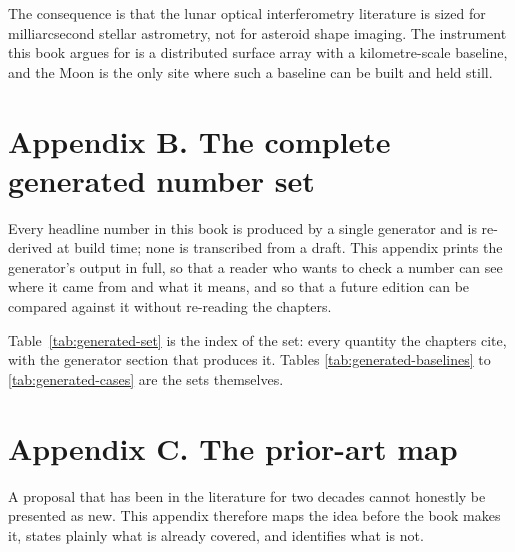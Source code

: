The consequence is that the lunar optical interferometry literature is sized
for milliarcsecond stellar astrometry, not for asteroid shape imaging. The
instrument this book argues for is a distributed surface array with a
kilometre-scale baseline, and the Moon is the only site where such a
baseline can be built and held still.
\clearpage

\chapter*{Appendix B. The complete generated number set}
\thispagestyle{plain}

Every headline number in this book is produced by a single generator and is
re-derived at build time; none is transcribed from a draft. This appendix
prints the generator's output in full, so that a reader who wants to check a
number can see where it came from and what it means, and so that a future
edition can be compared against it without re-reading the chapters.

Table~\ref{tab:generated-set} is the index of the set: every quantity the
chapters cite, with the generator section that produces it. Tables
\ref{tab:generated-baselines} to \ref{tab:generated-cases} are the sets
themselves.












\clearpage

\chapter*{Appendix C. The prior-art map}
\thispagestyle{plain}

A proposal that has been in the literature for two decades cannot honestly
be presented as new. This appendix therefore maps the idea before the book
makes it, states plainly what is already covered, and identifies what is
not.

